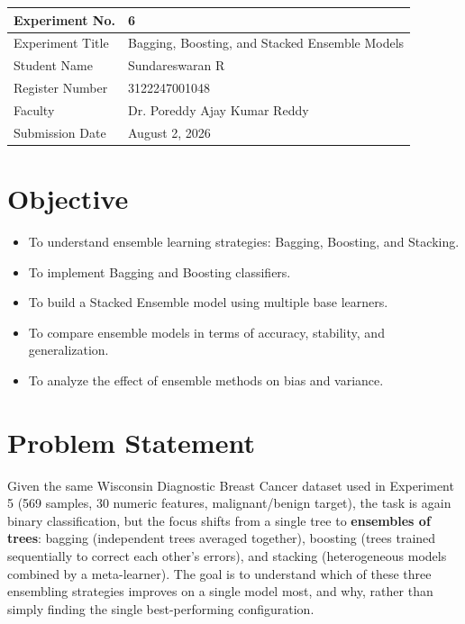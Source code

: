 \documentclass[12pt,a4paper]{article}
\begin{document}
\begin{tabular}{|p{4cm}|p{11cm}|}
\hline
Experiment No. & 6 \\ \hline
Experiment Title & Bagging, Boosting, and Stacked Ensemble Models\footnotemark\\ \hline
Student Name & Sundareswaran R \\ \hline
Register Number & 3122247001048 \\ \hline
Faculty & Dr. Poreddy Ajay Kumar Reddy \\ \hline
Submission Date & August 2, 2026 \\ \hline
\end{tabular}

\section{Objective}
\begin{itemize}[nosep]
\item To understand ensemble learning strategies: Bagging, Boosting, and Stacking.
\item To implement Bagging and Boosting classifiers.
\item To build a Stacked Ensemble model using multiple base learners.
\item To compare ensemble models in terms of accuracy, stability, and generalization.
\item To analyze the effect of ensemble methods on bias and variance.
\end{itemize}

\section{Problem Statement}
Given the same Wisconsin Diagnostic Breast Cancer dataset used in Experiment 5 (569 samples, 30
numeric features, malignant/benign target), the task is again binary classification, but the
focus shifts from a single tree to \textbf{ensembles of trees}: bagging (independent trees
averaged together), boosting (trees trained sequentially to correct each other's errors), and
stacking (heterogeneous models combined by a meta-learner). The goal is to understand which of
these three ensembling strategies improves on a single model most, and why, rather than simply
finding the single best-performing configuration.
\end{document}

